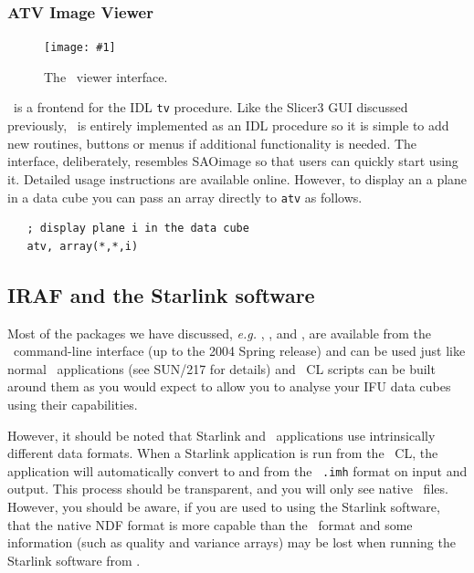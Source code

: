 \documentclass[twoside,11pt]{article}
\newcommand{\htmladdnormallink}[2]{#1}
\newcommand{\htmladdimg}[1]{}
\newcommand{\xref}[3]{#1}
\newcommand{\xlabel}[1]{}
\newcommand{\myfig} [5] {
  \begin{figure}
    \centering\texttt{[image: \#1]}
    \typeout{#1 inserted on page \arabic{page}}
    \caption{\label{#4}#5}
  \end{figure}
  }
\newcommand{\myfig}[5]{
    \label{#4} \htmladdimg{#3}\\
    Figure: #5\\
    }
\begin{document}
{\subsubsection{ATV Image Viewer}

\myfig{sc16_atv.eps}{height=0.4\textheight}{sc16_atv.gif}{sc16_atv_fig}{The
\ATV\ viewer interface.} 

\htmladdnormallink{\ATV}{http://www.physics.uci.edu/~barth/atv/}
\normalsize\  is a
frontend for the IDL {\tt tv} procedure.  Like the Slicer3 GUI
discussed previously, \ATV\ is entirely implemented as an IDL
\htmladdnormallink{procedure}{http://www.physics.uci.edu/~barth/atv/atv.pro}
so it is simple to add new routines, buttons or menus if additional
functionality is needed.  The interface, deliberately, resembles
SAOimage so that users can quickly start using it.  Detailed usage
\htmladdnormallink{instructions}{http://www.physics.uci.edu/~barth/atv/instructions.html}
are available online.  However,
to display an a plane in a data cube you can pass an array directly to
{\tt atv} as follows.

\small\begin{verbatim}
   ; display plane i in the data cube
   atv, array(*,*,i)
\end{verbatim}\normalsize

\subsection{\xlabel{sc16_irafstar}IRAF and the Starlink software\label{sc16_irafstar}}

Most of the packages we have discussed, \emph{e.g.} \KAPPAref,
\FIGAROref, and \CCDPACKref, are available from the \IRAFref\ command-line
interface (up to the 2004 Spring release) and can be used just like
normal \IRAF\ applications (see \xref{SUN/217}{sun217}{} for details)
and \IRAF\ CL scripts can be built around them as you would expect to
allow you to analyse your IFU data cubes using their capabilities.

However, it should be noted that Starlink and \IRAF\ applications use
intrinsically different data formats.  When a Starlink application is
run from the \IRAF\ CL, the application will automatically convert to
and from the \IRAF\ {\tt .imh} format on input and output.  This process
should be transparent, and you will only see native \IRAF\ files.
However, you should be aware, if you are used to using the Starlink
software, that the native \xref{NDF}{sun33}{} format is more capable
than the \IRAF\ format and some information (such as quality and
variance arrays) may be lost when running the Starlink software from
\IRAF.

}
\end{document}
